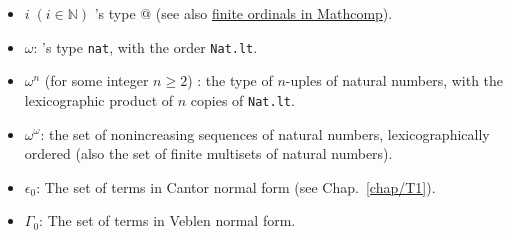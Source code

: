 \begin{itemize}
\item $i\;(i\in\mathbb{N})$ \coq's type @ (see also
\href{https://www.math.nagoya-u.ac.jp/~garrigue/lecture/2018_AW/mathcomp-1.7.0/htmldoc/mathcomp.ssreflect.fintype.html#Ordinal}{finite ordinals in Mathcomp}).
\item $\omega$: \coq's type \texttt{nat}, with the order \texttt{Nat.lt}.
\item $\omega^n$ (for some  integer  $n\geq 2$) : the type of $n$-uples of natural numbers, with the lexicographic product of $n$ copies of \texttt{Nat.lt}.
\item  $\omega^\omega$: the set of nonincreasing sequences of natural numbers, lexicographically ordered (also the set of finite multisets of natural numbers).
\item $\epsilon_0$: The set of terms in Cantor normal form (see Chap.~\ref{chap/T1}).
\item $\Gamma_0$: The set of terms in Veblen normal form.
\end{itemize}


